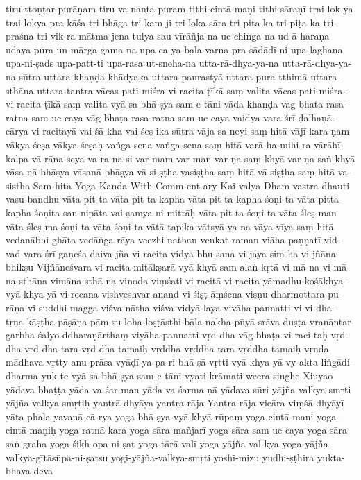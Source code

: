 {tiru-ttoṇṭar-purāṇam
tiru-va-nanta-puram
tithi-cintā-maṇi
tithi-sāraṇī
trai-lok-ya
trai-lokya-pra-kāśa
tri-bhāga
tri-kam-ji
tri-loka-sāra
tri-pita-ka
tri-piṭa-ka
tri-praśna
tri-vik-ra-mātma-jena
tulya-sau-vīrāñja-na
uc-chiṅga-na
ud-ā-haraṇa
udaya-pura
un-mārga-gama-na
upa-ca-ya-bala-varṇa-pra-sādādī-ni
upa-laghana
upa-ni-ṣads
upa-patt-ti
upa-rasa
ut-sneha-na
utta-rā-dhya-ya-na
utta-rā-dhya-ya-na-sūtra
uttara-khaṇḍa-khādyaka
uttara-paurastyā
uttara-pura-tthimā
uttara-sthāna
uttara-tantra
vācas-pati-miśra-vi-racita-ṭīkā-saṃ-valita
vācas-pati-miśra-vi-racita-ṭīkā-saṃ-valita-vyā-sa-bhā-ṣya-sam-e-tāni
vāda-khaṇḍa
vag-bhata-rasa-ratna-sam-uc-caya
vāg-bhaṭa-rasa-ratna-sam-uc-caya
vaidya-vara-śrī-ḍalhaṇā-cārya-vi-racitayā
vai-śā-kha
vai-śeṣ-ika-sūtra
vāja-sa-neyi-saṃ-hitā
vājī-kara-ṇam
vākya-śeṣa
vākya-śeṣaḥ
vaṅga-sena
vaṅga-sena-saṃ-hitā
varā-ha-mihi-ra
vārāhī-kalpa
vā-rāṇa-seya
va-ra-na-si
var-mam
var-man
var-ṇa-saṃ-khyā
var-ṇa-saṅ-khyā
vāsa-nā-bhāṣya
vāsanā-bhāṣya
vā-si-ṣṭha
vasiṣṭha-saṃ-hitā
vā-siṣṭha-saṃ-hitā
va-sistha-Sam-hita-Yoga-Kanda-With-Comm-ent-ary-Kai-valya-Dham
vastra-dhauti
vasu-bandhu
vāta-pit-ta
vāta-pit-ta-kapha
vāta-pit-ta-kapha-śoṇi-ta
vāta-pitta-kapha-śoṇita-san-nipāta-vai-ṣamya-ni-mittāḥ
vāta-pit-ta-śoṇi-ta
vāta-śleṣ-man
vāta-śleṣ-ma-śoṇi-ta
vāta-śoṇi-ta
vātā-tapika
vātsyā-ya-na
vāya-vīya-saṃ-hitā
vedanābhi-ghāta
vedāṅga-rāya
veezhi-nathan
venkat-raman
viāha-paṇṇatī
vid-vad-vara-śrī-gaṇeśa-daiva-jña-vi-racita
vidya-bhu-sana
vi-jaya-siṃ-ha
vi-jñāna-bhikṣu
Vijñāneśvara-vi-racita-mitākṣarā-vyā-khyā-sam-alaṅ-kṛtā
vi-mā-na
vi-mā-na-sthāna
vimāna-sthā-na
vinoda-viṃśati
vi-racitā
vi-racita-yāmadhu-kośākhya-vyā-khya-yā
vi-recana
vishveshvar-anand
vi-śiṣṭ-āṃśena
viṣṇu-dharmottara-pu-rāṇa
vi-suddhi-magga
viśva-nātha
viśva-vidyā-laya
vivāha-pannatti
vi-vi-dha-tṛṇa-kāṣṭha-pāṣāṇa-pāṃ-su-loha-loṣṭāsthi-bāla-nakha-pūyā-srāva-duṣṭa-vraṇāntar-garbha-śalyo-ddharaṇārthaṃ
viyāha-pannatti
vṛd-dha-vāg-bhaṭa-vi-raci-taḥ
vṛd-dha-vṛd-dha-tara-vṛd-dha-tamaiḥ
vṛddha-vṛddha-tara-vṛddha-tamaiḥ
vṛnda-mādhava
vṛtty-anu-prāsa
vyāḍī-ya-pa-ri-bhā-ṣā-vṛtti
vyā-khya-yā
vy-akta-liṅgādi-dharma-yuk-te
vyā-sa-bhā-ṣya-sam-e-tāni
vyati-krāmati
weera-singhe
Xiuyao
yādava-bhaṭṭa
yāda-va-śar-man
yāda-va-śarma-ṇā
yādava-sūri
yājña-valkya-smṛti
yājña-valkya-smṛtiḥ
yantrā-dhyāya
yantra-rāja
Yantra-rāja-vicāra-viṃśā-dhyāyī
yāta-phala
yavanā-cā-rya
yoga-bhā-ṣya-vyā-khyā-rūpaṃ
yoga-cintā-maṇi
yoga-cintā-maṇiḥ
yoga-ratnā-kara
yoga-sāra-mañjarī
yoga-sāra-sam-uc-caya
yoga-sāra-saṅ-graha
yoga-śikh-opa-ni-ṣat
yoga-tārā-valī
yoga-yājña-val-kya
yoga-yājña-valkya-gītāsūpa-ni-ṣatsu
yogi-yājña-valkya-smṛti
yoshi-mizu
yudhi-ṣṭhira
yukta-bhava-deva
}
